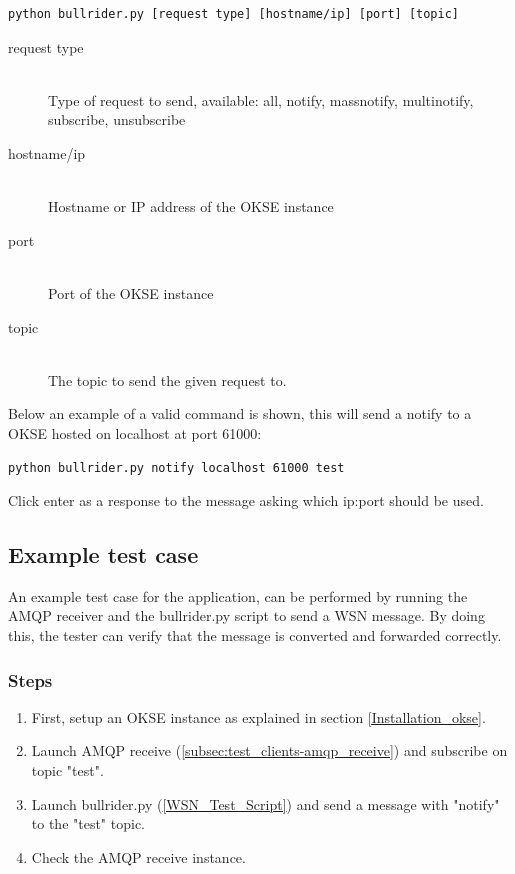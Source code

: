 \begin{verbatim}
python bullrider.py [request type] [hostname/ip] [port] [topic]
\end{verbatim}


\begin{description}
    \item[request type] \hfill \\
  Type of request to send, available: all, notify, massnotify, multinotify, subscribe, unsubscribe \hfill 
    \item[hostname/ip] \hfill \\
  Hostname or IP address of the OKSE instance \hfill 
    \item[port] \hfill \\
  Port of the OKSE instance \hfill 
    \item[topic] \hfill \\
  The topic to send the given request to. \hfill 
\end{description}
Below an example of a valid command is shown, this will send a notify to a OKSE hosted on localhost at port 61000:

\begin{verbatim}
python bullrider.py notify localhost 61000 test
\end{verbatim}
Click enter as a response to the message asking which ip:port should be used.

\subsection{Example test case}

An example test case for the application, can be performed by running the AMQP receiver and the bullrider.py script to send a WSN message. By doing this, the tester can verify that the message is converted and forwarded correctly.

\subsubsection{Steps}
\begin{enumerate}
\item First, setup an OKSE instance as explained in section  \ref{Installation_okse}. 
\item Launch AMQP receive (\ref{subsec:test_clients-amqp_receive}) and subscribe on topic "test". 
\item Launch bullrider.py (\ref{WSN_Test_Script}) and send a message with "notify" to the "test" topic. 
\item Check the AMQP receive instance.
\end{enumerate}

